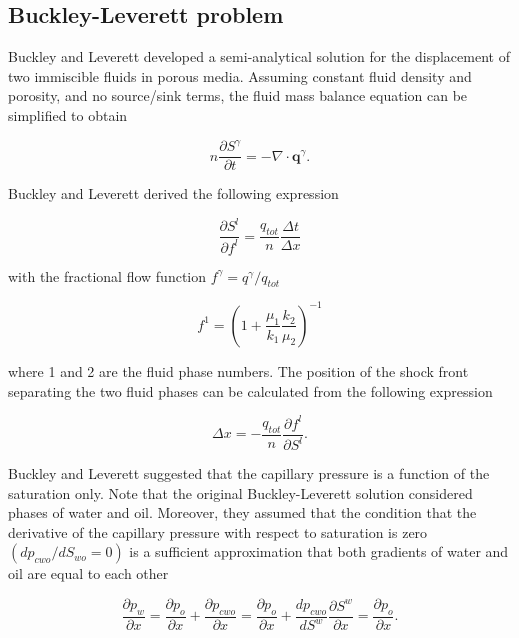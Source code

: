 \subsection{Buckley-Leverett problem}
Buckley and Leverett \cite{BucLev:1941} developed a semi-analytical solution for the displacement of two immiscible fluids in porous media. Assuming constant fluid density and porosity, and no source/sink terms, the fluid mass balance equation can be simplified to obtain

\begin{equation}
n \frac{\partial S^\gamma }{\partial t} = - \nabla \cdot
\mathbf{q}^\gamma.
\end{equation}

Buckley and Leverett derived the following expression

\begin{equation}
\frac{\partial S^l}{\partial f^l} = \frac{q_{tot}}{n} \frac{\Delta
t}{\Delta x}
\end{equation}

with the fractional flow function $f^\gamma = q^\gamma/q_{tot}$

\begin{equation}
f^1 = \left( 1 + \frac{\mu_1}{k_1} \frac{k_2}{\mu_2} \right)^{-1}
\end{equation}

where 1 and 2 are the fluid phase numbers. The position of the shock front separating the two fluid phases can be calculated from the following expression

\begin{equation}
\Delta x = - \frac{q_{tot}}{n} \frac{\partial f^l}{\partial S^l}.
\end{equation}

Buckley and Leverett suggested that the capillary pressure is a function of the saturation only. Note that the original Buckley-Leverett solution considered phases of water and oil. Moreover, they assumed that the condition that the derivative of the capillary pressure with respect to saturation is zero $(dp_{cwo}/dS_{wo}= 0)$ is a sufficient approximation that both
gradients of water and oil are equal to each other

\begin{equation}
\frac{\partial p_w }{\partial x} = \frac{\partial p_o}{\partial x}
+ \frac{\partial p_{cwo}}{\partial x} = \frac{\partial p_o
}{\partial x} + \frac{dp_{cwo}}{dS^w }\frac{\partial S^w}{\partial
x} = \frac{\partial p_o}{\partial x}.
\end{equation}

